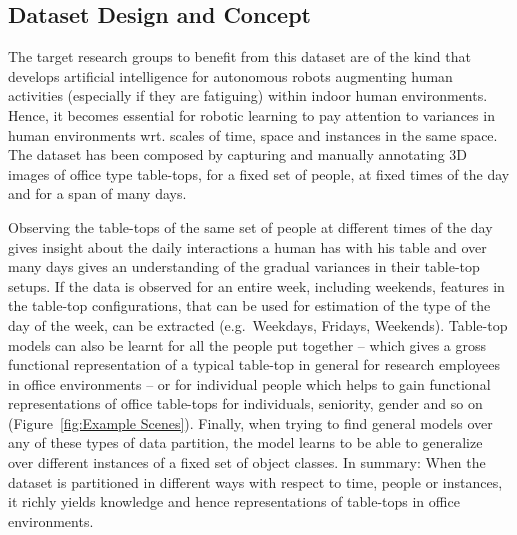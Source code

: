 \documentclass[letterpaper, 10 pt, conference]{ieeeconf}  %
\begin{document}
\subsection{Dataset Design and Concept}
\label{ssec:Dataset Design and Concept}

The target research groups to benefit from this dataset are of the kind that develops artificial intelligence for autonomous robots augmenting human activities (especially if they are fatiguing) within indoor human environments. Hence, it becomes essential for robotic learning to pay attention to variances in human environments wrt. scales of time, space and instances in the same space. The dataset has been composed by capturing and manually annotating 3D images of office type table-tops, for a fixed set of people, at fixed times of the day and for a span of many days.

Observing the table-tops of the same set of people at different times of the day gives insight about the daily interactions a human has with his table and over many days gives an understanding of the gradual variances in their table-top setups. If the data is observed for an entire week, including weekends, features in the table-top configurations, that can be used for estimation of the type of the day of the week, can be extracted (e.g.\ Weekdays, Fridays, Weekends). Table-top models can also be learnt for all the people put together -- which gives a gross functional representation of a typical table-top in general for research employees in office environments -- or for individual people which helps to gain functional representations of office table-tops for individuals, seniority, gender and so on (Figure~\ref{fig:Example Scenes}). Finally, when trying to find general models over any of these types of data partition, the model learns to be able to generalize over different instances of a fixed set of object classes. In summary: When the dataset is partitioned in different ways with respect to time, people or instances, it richly yields knowledge and hence representations of table-tops in office environments.
\end{document}
